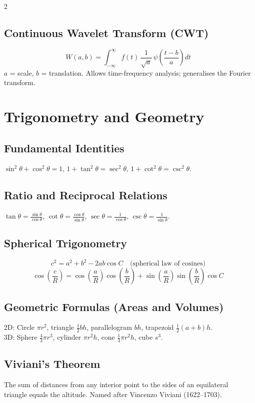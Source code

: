 \documentclass[10pt,a4paper]{article}
\begin{document}
\begin{multicols}{2}
\subsection{Continuous Wavelet Transform (CWT)}
\[
W(a,b) = \int_{-\infty}^{\infty} f(t)\,\frac{1}{\sqrt{a}}\,\psi\!\left(\frac{t-b}{a}\right)dt
\]
$a$ = scale, $b$ = translation. Allows time-frequency analysis; generalises the Fourier transform.

\section{Trigonometry and Geometry}

\subsection{Fundamental Identities}
$\sin^2\theta + \cos^2\theta = 1$, $1+\tan^2\theta = \sec^2\theta$, $1+\cot^2\theta = \csc^2\theta$.

\subsection{Ratio and Reciprocal Relations}
$\tan\theta = \frac{\sin\theta}{\cos\theta}$, $\cot\theta = \frac{\cos\theta}{\sin\theta}$, $\sec\theta = \frac{1}{\cos\theta}$, $\csc\theta = \frac{1}{\sin\theta}$.

\subsection{Spherical Trigonometry}
\[
c^2 = a^2 + b^2 - 2ab\cos C \quad \text{(spherical law of cosines)}
\]
\[
\cos\left(\frac{c}{R}\right) = \cos\!\left(\frac{a}{R}\right)\cos\!\left(\frac{b}{R}\right) + \sin\!\left(\frac{a}{R}\right)\sin\!\left(\frac{b}{R}\right)\cos C
\]

\subsection{Geometric Formulas (Areas and Volumes)}
2D: Circle $\pi r^2$, triangle $\frac{1}{2}bh$, parallelogram $bh$, trapezoid $\frac{1}{2}(a+b)h$.\\
3D: Sphere $\frac{4}{3}\pi r^3$, cylinder $\pi r^2 h$, cone $\frac{1}{3}\pi r^2 h$, cube $s^3$.

\subsection{Viviani's Theorem}
The sum of distances from any interior point to the sides of an equilateral triangle equals the altitude. Named after Vincenzo Viviani (1622--1703).


\end{multicols}
\end{document}
